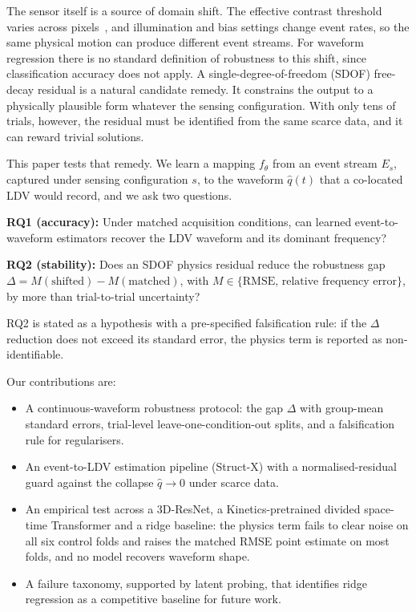 \documentclass[conference]{IEEEtran}
\begin{document}
The sensor itself is a source of domain shift. The effective contrast threshold varies across pixels~\cite{Gallego2020}, and illumination and bias settings change event rates, so the same physical motion can produce different event streams. For waveform regression there is no standard definition of robustness to this shift, since classification accuracy does not apply. A single-degree-of-freedom (SDOF) free-decay residual is a natural candidate remedy. It constrains the output to a physically plausible form whatever the sensing configuration. With only tens of trials, however, the residual must be identified from the same scarce data, and it can reward trivial solutions.

This paper tests that remedy. We learn a mapping $f_\theta$ from an event stream $E_s$, captured under sensing configuration $s$, to the waveform $\hat{q}(t)$ that a co-located LDV would record, and we ask two questions.

\textbf{RQ1 (accuracy):} Under matched acquisition conditions, can learned event-to-waveform estimators recover the LDV waveform and its dominant frequency?

\textbf{RQ2 (stability):} Does an SDOF physics residual reduce the robustness gap $\Delta = M(\text{shifted}) - M(\text{matched})$, with $M \in \{\text{RMSE, relative frequency error}\}$, by more than trial-to-trial uncertainty?

RQ2 is stated as a hypothesis with a pre-specified falsification rule: if the $\Delta$ reduction does not exceed its standard error, the physics term is reported as non-identifiable.

Our contributions are:
\begin{itemize}
\item A continuous-waveform robustness protocol: the gap $\Delta$ with group-mean standard errors, trial-level leave-one-condition-out splits, and a falsification rule for regularisers.
\item An event-to-LDV estimation pipeline (Struct-X) with a normalised-residual guard against the collapse $\hat{q} \to 0$ under scarce data.
\item An empirical test across a 3D-ResNet, a Kinetics-pretrained divided space-time Transformer and a ridge baseline: the physics term fails to clear noise on all six control folds and raises the matched RMSE point estimate on most folds, and no model recovers waveform shape.
\item A failure taxonomy, supported by latent probing, that identifies ridge regression as a competitive baseline for future work.
\end{itemize}
\end{document}
